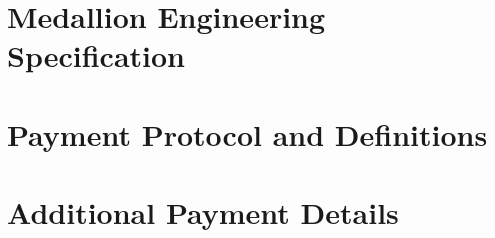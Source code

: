\documentclass{article}
\begin{document}
    \section{Medallion Engineering Specification}
    \label{medallionspow}
    

    \section{Payment Protocol and Definitions}
    \label{paymentsprotocol}
    
    
    \section{Additional Payment Details}
    \label{paymentsextra}
    
    
\end{document}
